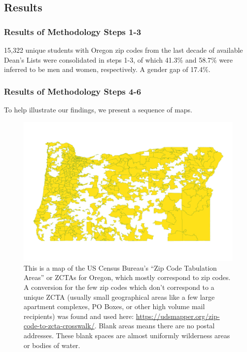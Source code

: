 \documentclass[10pt]{article}
\begin{document}
\subsection{Results}

\subsubsection{Results of Methodology Steps 1-3}

15,322 unique students with Oregon zip codes from the last decade of available Dean's Lists were consolidated in steps 1-3, of which 41.3\% and 58.7\% were inferred to be men and women, respectively. A gender gap of 17.4\%.

\subsubsection{Results of Methodology Steps 4-6}

To help illustrate our findings, we present a sequence of maps.


\begin{figure}[H]
	\centering
	\includegraphics[width=0.8\linewidth]{../visualizations/zcta}
	\caption{This is a map of the US Census Bureau's ``Zip Code Tabulation Areas'' or ZCTAs for Oregon, which mostly correspond to zip codes. A conversion for the few zip codes which don't correspond to a unique ZCTA (usually small geographical areas like a few large apartment complexes, PO Boxes, or other high volume mail recipients) was found and used here: \url{https://udsmapper.org/zip-code-to-zcta-crosswalk/}. Blank areas means there are no postal addresses. These blank spaces are almost uniformly wilderness areas or bodies of water.}
	\label{fig:zcta}
\end{figure}

\qquad
\end{document}
